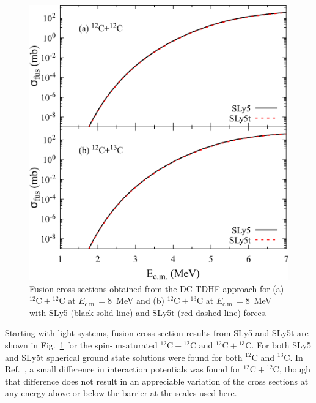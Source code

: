 \begin{figure}
\includegraphics[width=\textwidth]{../Figures/TensorXsec/CrossSections_CC.pdf}
\caption{Fusion cross sections obtained from the DC-TDHF approach for (a) $^{12}\mathrm{C}+\mathrm{^{12}C}$ at $E_{\mathrm{c.m.}}=8$~MeV and (b) $^{12}\mathrm{C}+\mathrm{^{13}C}$ at $E_{\mathrm{c.m.}}=8$~MeV with SLy5 (black solid line) and SLy5t (red dashed line) forces.
	\label{Fig:CCxsec}}
\end{figure}

Starting with light systems, fusion cross section results from SLy5 and SLy5t are shown in Fig.~\ref{Fig:CCxsec} for the spin-unsaturated $^{12}\mathrm{C}+\mathrm{^{12}C}$ and $^{12}\mathrm{C}+\mathrm{^{13}C}$.
For both SLy5 and SLy5t spherical ground state solutions were found for both $^{12}\mathrm{C}$ and $^{13}\mathrm{C}$.
In Ref.~\citep{guo2018b}, a small difference in interaction potentials was found for $^{12}\mathrm{C}+\mathrm{^{12}C}$, though that difference does not result in an appreciable variation of the cross sections at any energy above or below the barrier at the scales used here.

